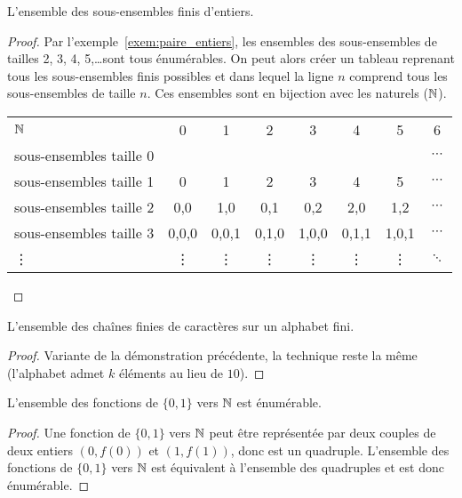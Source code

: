 \begin{myexem}
  L'ensemble des sous-ensembles finis d'entiers.
  \begin{proof}
  Par l'exemple~\ref{exem:paire_entiers}, les ensembles des sous-ensembles de tailles 2, 3, 4, 5,\dots sont tous énumérables. On peut alors créer un tableau reprenant tous les sous-ensembles finis possibles et dans lequel la ligne $n$ comprend tous les sous-ensembles de taille $n$. Ces ensembles sont en bijection avec les naturels ($\mathbb{N}$).

    \begin{tabular}{ l c c  c  c c c  c }
 	 $\mathbb{N}$ & 0 & 1 & 2  & 3 & 4 & 5 & 6  \\
 	 sous-ensembles  taille 0  & {} & {} & {} & {} & {} & {}  & $\cdots$ \\
 	 sous-ensembles  taille 1  & {0} & {1} & {2} & {3} & {4} & {5} & $\cdots$ \\
 	 sous-ensembles  taille 2  & {0,0} & {1,0} & {0,1} & {0,2} & {2,0} & {1,2}  & $\cdots$ \\
 	 sous-ensembles  taille 3  & {0,0,0} & {0,0,1} & {0,1,0} & {1,0,0} & {0,1,1} & {1,0,1}  & $\cdots$ \\
 	 \vdots  & {\vdots} & {\vdots} & {\vdots} & {\vdots} & {\vdots} & {\vdots}  & $\ddots$ \\
	\end{tabular}
  \end{proof}
\end{myexem}

\begin{myexem}
\label{exem:chaines_finies}
  L'ensemble des chaînes finies de caractères sur un alphabet fini.
\begin{proof}
 Variante de la démonstration précédente, la technique reste la même (l'alphabet admet $k$ éléments au lieu de $10$).
\end{proof}
\end{myexem}

\begin{myexem}
 L'ensemble des fonctions de  $\{0, 1\}$ vers $\mathbb{N}$ est énumérable.
 \begin{proof}
  Une fonction de $\{0, 1\}$ vers $\mathbb{N}$ peut être représentée par deux couples de deux entiers $(0, f(0))$ et $(1, f(1))$, donc est un quadruple. L'ensemble des fonctions de $\{0, 1\}$ vers $\mathbb{N}$ est équivalent à l'ensemble des quadruples et est donc énumérable.
 \end{proof}
\end{myexem}

